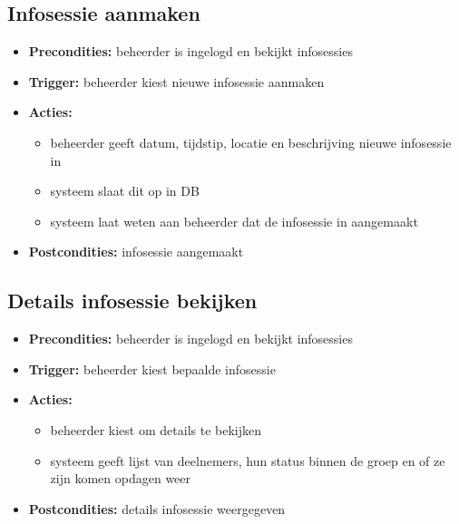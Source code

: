 \documentclass[11pt,a4paper,oneside]{article}
\begin{document}
\subsection{Infosessie aanmaken}
\begin{itemize}
\item \textbf{Precondities:} beheerder is ingelogd en bekijkt infosessies
\item \textbf{Trigger:} beheerder kiest nieuwe infosessie aanmaken
\item \textbf{Acties:} \begin{itemize}
\item	beheerder geeft datum, tijdstip, locatie en beschrijving nieuwe infosessie in
\item 	systeem slaat dit op in DB
\item	systeem laat weten aan beheerder dat de infosessie in aangemaakt
\end{itemize}
\item \textbf{Postcondities:} infosessie aangemaakt
\end{itemize}

\subsection{Details infosessie bekijken}
\begin{itemize}
\item \textbf{Precondities:} beheerder is ingelogd en bekijkt infosessies
\item \textbf{Trigger:} beheerder kiest bepaalde infosessie
\item \textbf{Acties:} \begin{itemize}
\item	beheerder kiest om details te bekijken
\item 	systeem geeft lijst van deelnemers, hun status binnen de groep en of ze zijn komen opdagen weer
\end{itemize}
\item \textbf{Postcondities:} details infosessie weergegeven
\end{itemize}
\end{document}
